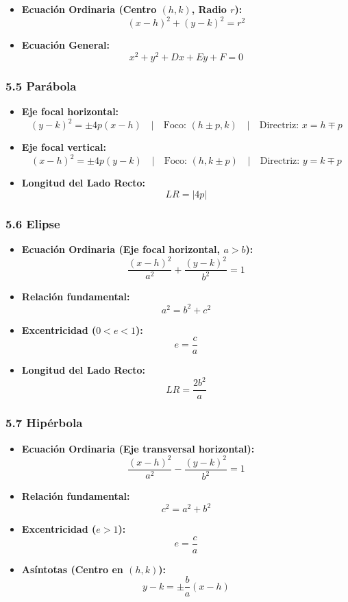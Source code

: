 \documentclass[11pt,a4paper]{article}
\begin{document}
\begin{itemize}
  \item \textbf{Ecuación Ordinaria (Centro $(h, k)$, Radio $r$):}
  \[
    (x - h)^2 + (y - k)^2 = r^2
  \]
  \item \textbf{Ecuación General:}
  \[
    x^2 + y^2 + Dx + Ey + F = 0
  \]
\end{itemize}

\subsubsection*{5.5 Parábola}

\begin{itemize}
  \item \textbf{Eje focal horizontal:}
  \[
    (y - k)^2 = \pm 4p(x - h) \quad | \quad \text{Foco: } (h \pm p, k) \quad | \quad \text{Directriz: } x = h \mp p
  \]
  \item \textbf{Eje focal vertical:}
  \[
    (x - h)^2 = \pm 4p(y - k) \quad | \quad \text{Foco: } (h, k \pm p) \quad | \quad \text{Directriz: } y = k \mp p
  \]
  \item \textbf{Longitud del Lado Recto:}
  \[
    LR = |4p|
  \]
\end{itemize}

\subsubsection*{5.6 Elipse}

\begin{itemize}
  \item \textbf{Ecuación Ordinaria (Eje focal horizontal, $a > b$):}
  \[
    \frac{(x - h)^2}{a^2} + \frac{(y - k)^2}{b^2} = 1
  \]
  \item \textbf{Relación fundamental:}
  \[
    a^2 = b^2 + c^2
  \]
  \item \textbf{Excentricidad ($0 < e < 1$):}
  \[
    e = \frac{c}{a}
  \]
  \item \textbf{Longitud del Lado Recto:}
  \[
    LR = \frac{2b^2}{a}
  \]
\end{itemize}

\subsubsection*{5.7 Hipérbola}

\begin{itemize}
  \item \textbf{Ecuación Ordinaria (Eje transversal horizontal):}
  \[
    \frac{(x - h)^2}{a^2} - \frac{(y - k)^2}{b^2} = 1
  \]
  \item \textbf{Relación fundamental:}
  \[
    c^2 = a^2 + b^2
  \]
  \item \textbf{Excentricidad ($e > 1$):}
  \[
    e = \frac{c}{a}
  \]
  \item \textbf{Asíntotas (Centro en $(h,k)$):}
  \[
    y - k = \pm \frac{b}{a}(x - h)
  \]
\end{itemize}
\end{document}
